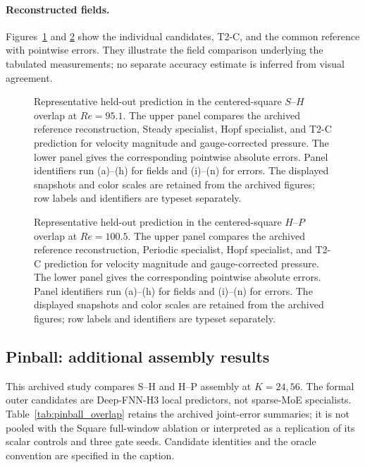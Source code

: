 \paragraph{Reconstructed fields.}
Figures~\ref{fig:app_square_sh_full} and \ref{fig:app_square_hp_full}
show the individual candidates, T2-C, and the common reference with
pointwise errors. They illustrate the field comparison underlying
the tabulated measurements; no separate accuracy estimate is inferred
from visual agreement.

\begin{figure}[p]
\centering
{}

\vspace{0.35em}
\caption{Representative held-out prediction in the centered-square
$S$--$H$ overlap at $Re=95.1$. The upper panel compares the archived reference reconstruction,
Steady specialist, Hopf specialist, and T2-C prediction for velocity
magnitude and gauge-corrected pressure. The lower panel gives the
corresponding pointwise absolute errors. Panel identifiers run (a)--(h) for fields and (i)--(n) for errors. The displayed snapshots and color scales are retained from the archived figures; row labels and identifiers are typeset separately.}
\label{fig:app_square_sh_full}
\end{figure}

\begin{figure}[p]
\centering
{}

\vspace{0.35em}
\caption{Representative held-out prediction in the centered-square
$H$--$P$ overlap at $Re=100.5$. The upper panel compares the archived reference reconstruction, Periodic specialist, Hopf specialist, and T2-C prediction for velocity magnitude and gauge-corrected pressure. The lower panel gives the
corresponding pointwise absolute errors. Panel identifiers run (a)--(h) for fields and (i)--(n) for errors. The displayed snapshots and color scales are retained from the archived figures; row labels and identifiers are typeset separately.}
\label{fig:app_square_hp_full}
\end{figure}

\FloatBarrier
\subsection{Pinball: additional assembly results}
\label{app:pinball_overlap_results}
This archived study compares S--H and H--P assembly at $K=24,56$.
The formal outer candidates are Deep-FNN-H3 local predictors, not
sparse-MoE specialists. Table~\ref{tab:pinball_overlap} retains the
archived joint-error summaries; it is not pooled with the Square
full-window ablation or interpreted as a replication of its scalar
controls and three gate seeds. Candidate identities and the oracle
convention are specified in the caption.

